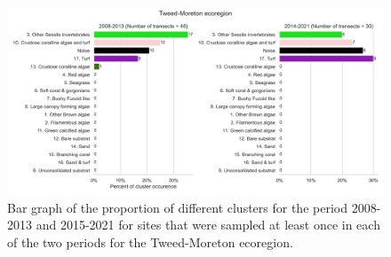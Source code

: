 \begin{figure}
\hypertarget{fig:chap2figS43}{%
\centering
\includegraphics{03-Chapitre2/figures/supplementary/08-temporal_change_ecoregion_Tweed-Moreton.png}
\caption{Bar graph of the proportion of different clusters for the
period 2008-2013 and 2015-2021 for sites that were sampled at least once
in each of the two periods for the Tweed-Moreton
ecoregion.}\label{fig:chap2figS43}
}
\end{figure}


\let\sectionmark\oldsectionmark

\captionsetup[figure]{list=yes}
\captionsetup[table]{list=yes}

\renewcommand{\thefigure}{\arabic{figure}}
\renewcommand{\thetable}{\arabic{table}}   


